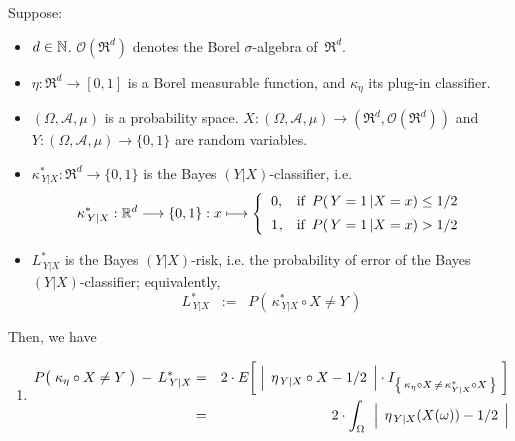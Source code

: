 
\vskip 0.5cm
\begin{theorem}
\mbox{}\vskip 0.1cm
\noindent
Suppose:
\begin{itemize}
\item
	$d \in \mathbb{N}$.
	$\mathcal{O}(\Re^{d})$ denotes the Borel $\sigma$-algebra of \,$\Re^{d}$.
\item
	$\eta : \Re^{d} \longrightarrow [0,1]$ is a Borel measurable function, and
	$\kappa_{\eta}$ its plug-in classifier.
\item
	$(\Omega,\mathcal{A},\mu)$ is a probability space.
	$X : (\Omega,\mathcal{A},\mu) \longrightarrow (\Re^{d},\mathcal{O}(\Re^{d}))$ and\,
	$Y : (\Omega,\mathcal{A},\mu) \longrightarrow \{0,1\}$
	are random variables.
\item
	$\kappa^{*}_{\,Y \vert X} : \Re^{d} \longrightarrow \{0,1\}$ is the Bayes $(Y \vert X)$-classifier, i.e.
	\begin{equation*}
	\kappa^{*}_{\,Y \vert X} : \Re^{d} \longrightarrow \{0,1\} : x \longmapsto
		\left\{\begin{array}{cl}
			0, & \textnormal{if \,$P(\,Y=1 \,\vert X = x) \leq 1/2$}
			\\
			\overset{{\color{white}-}}{1}, & \textnormal{if \,$P(\,Y=1 \,\vert X = x) > 1/2$}
		\end{array}\right.
	\end{equation*}
\item
	$L^{*}_{\,Y \vert X}$ is the Bayes $(Y \vert X)$-risk,
	i.e. the probability of error of the Bayes $(Y \vert X)$-classifier;
	equivalently,
	\begin{equation*}
	L^{*}_{\,Y \vert X} \;\; := \;\; P\!\left(\, \kappa^{*}_{\,Y \vert X} \circ X \neq Y \,\right)
	\end{equation*}	
\end{itemize}
Then, we have
\begin{enumerate}
\item
	\begin{eqnarray*}
	P\!\left(\;\kappa_{\eta} \overset{{\color{white}.}}{\circ} X \neq Y \;\right) \,-\, L^{*}_{\,Y \vert X}
	& = &
		2 \cdot E\!\left[\;
			\left\vert\;\, \eta_{\,Y\vert X} \circ X \overset{{\color{white}.}}{-} 1/2 \;\,\right\vert
			\cdot
			I_{\left\{\,\kappa_{\eta} \circ X \,\neq\, \kappa^{*}_{Y \vert X} \circ X\,\right\}}
			\;\right]
	\\
	& = &
		2 \cdot \int_{\Omega}\,\;
			\left\vert\;\, \eta_{\,Y\vert X}(X(\omega)) \overset{{\color{white}.}}{-} 1/2 \;\,\right\vert

\end{eqnarray*}
\end{enumerate}
\end{theorem}
